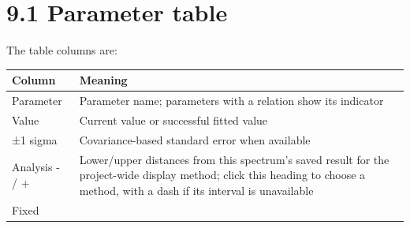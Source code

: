 \documentclass[
  10pt,
  a4paper,
  oneside]{scrreprt}
\begin{document}
\hypertarget{parameter-table}{%
\section{9.1 Parameter table}\label{parameter-table}}

The table columns are:

\begin{longtable}[]{@{}ll@{}}
\toprule
\begin{minipage}[b]{0.47\columnwidth}\raggedright
Column\strut
\end{minipage} & \begin{minipage}[b]{0.47\columnwidth}\raggedright
Meaning\strut
\end{minipage}\tabularnewline
\midrule
\endhead
\begin{minipage}[t]{0.47\columnwidth}\raggedright
Parameter\strut
\end{minipage} & \begin{minipage}[t]{0.47\columnwidth}\raggedright
Parameter name; parameters with a relation show its indicator\strut
\end{minipage}\tabularnewline
\begin{minipage}[t]{0.47\columnwidth}\raggedright
Value\strut
\end{minipage} & \begin{minipage}[t]{0.47\columnwidth}\raggedright
Current value or successful fitted value\strut
\end{minipage}\tabularnewline
\begin{minipage}[t]{0.47\columnwidth}\raggedright
±1 sigma\strut
\end{minipage} & \begin{minipage}[t]{0.47\columnwidth}\raggedright
Covariance-based standard error when available\strut
\end{minipage}\tabularnewline
\begin{minipage}[t]{0.47\columnwidth}\raggedright
Analysis - / +\strut
\end{minipage} & \begin{minipage}[t]{0.47\columnwidth}\raggedright
Lower/upper distances from this spectrum's saved result for the
project-wide display method; click this heading to choose a method, with
a dash if its interval is unavailable\strut
\end{minipage}\tabularnewline
\begin{minipage}[t]{0.47\columnwidth}\raggedright
Fixed\strut
\end{minipage} & \begin{minipage}[t]{0.47\columnwidth}\raggedright

\end{minipage}
\end{longtable}
\end{document}
